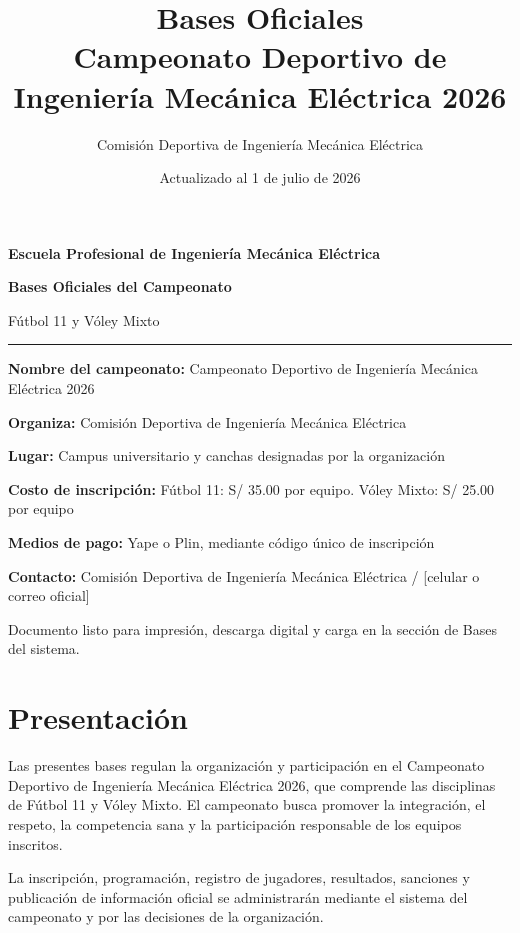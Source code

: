\documentclass[12pt,a4paper]{article}
\title{\textbf{Bases Oficiales}\\[0.35cm]
Campeonato Deportivo de Ingeniería Mecánica Eléctrica 2026}
\author{Comisión Deportiva de Ingeniería Mecánica Eléctrica}
\date{Actualizado al 1 de julio de 2026}
\newcommand{\dato}[2]{\noindent\textbf{#1:} #2\par\vspace{0.25em}}
\begin{document}
\begin{titlepage}
  \centering
  \vspace*{1.5cm}
  {\Large \textbf{Escuela Profesional de Ingeniería Mecánica Eléctrica}\par}
  \vspace{1.2cm}
  {\Huge \textbf{Bases Oficiales del Campeonato}\par}
  \vspace{0.35cm}
  {\LARGE Fútbol 11 y Vóley Mixto\par}
  \vspace{1.2cm}
  \rule{0.72\textwidth}{1.2pt}
  \vspace{0.9cm}

  \begin{minipage}{0.82\textwidth}
    \dato{Nombre del campeonato}{Campeonato Deportivo de Ingeniería Mecánica Eléctrica 2026}
    \dato{Organiza}{Comisión Deportiva de Ingeniería Mecánica Eléctrica}
    \dato{Lugar}{Campus universitario y canchas designadas por la organización}
    \dato{Costo de inscripción}{Fútbol 11: S/ 35.00 por equipo. Vóley Mixto: S/ 25.00 por equipo}
    \dato{Medios de pago}{Yape o Plin, mediante código único de inscripción}
    \dato{Contacto}{Comisión Deportiva de Ingeniería Mecánica Eléctrica / [celular o correo oficial]}
  \end{minipage}

  \vfill
  {\large Documento listo para impresión, descarga digital y carga en la sección de Bases del sistema.\par}
  \vspace{1cm}
\end{titlepage}

\tableofcontents
\newpage
{}

\section{Presentación}

Las presentes bases regulan la organización y participación en el Campeonato Deportivo de Ingeniería Mecánica Eléctrica 2026, que comprende las disciplinas de Fútbol 11 y Vóley Mixto. El campeonato busca promover la integración, el respeto, la competencia sana y la participación responsable de los equipos inscritos.

La inscripción, programación, registro de jugadores, resultados, sanciones y publicación de información oficial se administrarán mediante el sistema del campeonato y por las decisiones de la organización.
\end{document}

